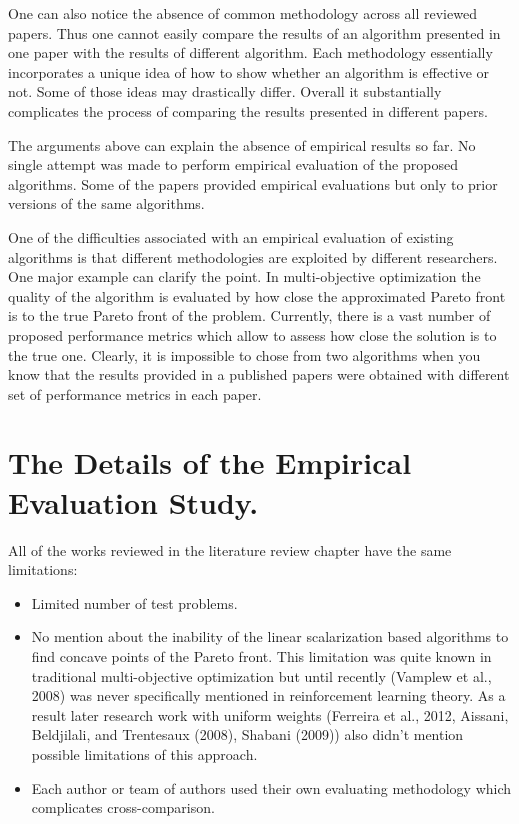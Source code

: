 One can also notice the absence of common methodology across all reviewed papers. Thus one cannot easily compare the results of an algorithm presented in one paper with the results of different algorithm. Each methodology essentially incorporates a unique idea of how to show whether an algorithm is effective or not. Some of those ideas may drastically differ. Overall it substantially complicates the process of comparing the results presented in different papers.

The arguments above can explain the absence of empirical results so far. No single attempt was made to perform empirical evaluation of the proposed algorithms. Some of the papers provided empirical evaluations but only to prior versions of the same algorithms.

One of the difficulties associated with an empirical evaluation of existing algorithms is that different methodologies are exploited by different researchers. One major example can clarify the point. In multi-objective optimization the quality of the algorithm is evaluated by how close the approximated Pareto front is to the true Pareto front of the problem. Currently, there is a vast number of proposed performance metrics which allow to assess how close the solution is to the true one. Clearly, it is impossible to chose from two algorithms when you know that the results provided in a published papers were obtained with different set of performance metrics in each paper.

\section{The Details of the Empirical Evaluation Study.}

All of the works reviewed in the literature review chapter have the same limitations:
\begin{itemize}
  \item Limited number of test problems.
  \item No mention about the inability of the linear scalarization based algorithms to find concave points of the Pareto front. This limitation was quite known in traditional multi-objective optimization but until recently (Vamplew et al., 2008\nocite{vamplew2008limitations}) was never specifically mentioned in reinforcement learning theory. As a result later research work with uniform weights (Ferreira et al., 2012\nocite{F6363312}, Aissani, Beldjilali, and Trentesaux (2008)\nocite{aissani2008use}, Shabani (2009)\nocite{shabani2009incorporating}) also didn't mention possible limitations of this approach.
  \item Each author or team of authors used their own evaluating methodology which complicates cross-comparison.
\end{itemize}

